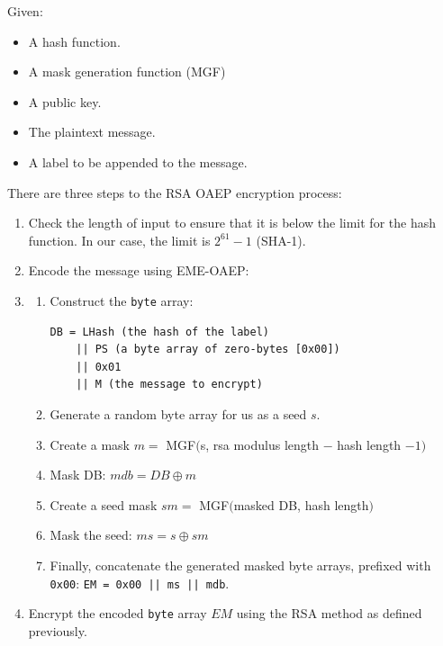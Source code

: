     Given:
    
    \begin{itemize}
      \item A hash function.
      \item A mask generation function (MGF)
      \item A public key.
      \item The plaintext message.
      \item A label to be appended to the message.
    \end{itemize}
    
    There are three steps to the RSA OAEP encryption process:
    
    \begin{enumerate}
      \item Check the length of input to ensure that it is below the limit for the hash function. In our case, the limit is $2^{61}-1$ (SHA-1).
      \item Encode the message using EME-OAEP:
      \item \begin{enumerate}
                  \item Construct the \verb!byte! array:
                  		\begin{verbatim}
DB = LHash (the hash of the label)
    || PS (a byte array of zero-bytes [0x00])
    || 0x01
    || M (the message to encrypt)
                            \end{verbatim}
                  \item Generate a random byte array for us as a seed $s$.
                  \item Create a mask $m = $ MGF$($s, rsa modulus length $-$ hash length $- 1)$
                  \item Mask DB: $mdb = DB \oplus m$
                  \item Create a seed mask $sm =  $ MGF$($masked DB, hash length$)$
                  \item Mask the seed: $ms = s \oplus sm$
                  \item Finally, concatenate the generated masked byte arrays, prefixed with \verb!0x00!:
                            \verb!EM = 0x00 || ms || mdb!.
                \end{enumerate}
      \item Encrypt the encoded \verb!byte! array $EM$ using the RSA method as defined previously.
    \end{enumerate}
    
